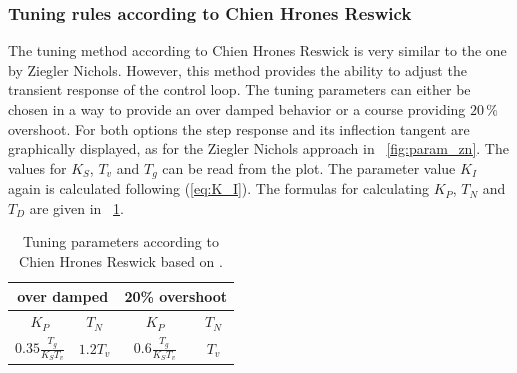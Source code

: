 


\subsubsection{Tuning rules according to Chien Hrones Reswick}
The tuning method according to Chien Hrones Reswick is very similar to the one by Ziegler Nichols. However, this method provides the ability to adjust the transient response of the control loop. The tuning parameters can either be chosen in a way to provide an over damped behavior or a course providing $20\, \%$ overshoot. \cite{Reg_11}
For both options the step response and its inflection tangent are graphically displayed, as for the Ziegler Nichols approach in \figurename~\ref{fig:param_zn}.
The values for $K_{S}$, $T_{v}$ and $T_{g}$ can be read from the plot. The parameter value $K_{I}$ again is calculated following (\ref{eq:K_I}). The formulas for calculating  $K_{P}$,  $T_{N}$ and $T_{D}$ are given in \tablename~\ref{tab:param_chr}.

\begin{table}[h]
  \centering
  \begin{tabular}{cc|cc}
    \toprule
     \multicolumn{2}{c|}{over damped} & \multicolumn{2}{c}{20\% overshoot} \\
    \midrule
    $K_{P}$ &  $T_{N}$ & $K_{P}$ &  $T_{N}$ \\
    \midrule
     $0.35\frac{T_{g}}{K_{S}T_{v}}$ & $1.2T_{v}$  & $0.6\frac{T_{g}}{K_{S}T_{v}}$ & $T_{v}$ \\
    \bottomrule
\end{tabular}
  \caption[Tuning parameters Chien Hrones Reswick]{Tuning parameters according to Chien Hrones Reswick based on \cite{Reg_17}.}
  \label{tab:param_chr}
\end{table}

